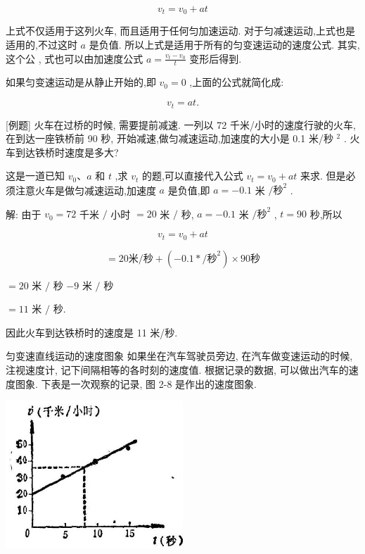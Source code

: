 \documentclass[10pt]{article}
\begin{document}
\[
{v}_{t} = {v}_{0} + {at}
\]

上式不仅适用于这列火车, 而且适用于任何匀加速运动. 对于匀减速运动,上式也是适用的,不过这时 \(a\) 是负值. 所以上式是适用于所有的匀变速运动的速度公式. 其实, 这个公 , 式也可以由加速度公式 \(a = \frac{{v}_{t} - {v}_{0}}{t}\) 变形后得到.

如果匀变速运动是从静止开始的,即 \({v}_{0} = 0\) ,上面的公式就简化成:

\[
{v}_{t} = {at}\text{.}
\]

[例题] 火车在过桥的时候, 需要提前减速. 一列以 72 千米/小时的速度行驶的火车, 在到达一座铁桥前 90 秒, 开始减速,做匀减速运动,加速度的大小是 0.1 米/秒 \({}^{2}\) . 火车到达铁桥时速度是多大?

这是一道已知 \({v}_{0}\text{、}a\) 和 \(t\) ,求 \({v}_{t}\) 的题,可以直接代入公式 \({v}_{t} = {v}_{0} + {at}\) 来求. 但是必须注意火车是做匀减速运动,加速度 \(a\) 是负值,即 \(a = - {0.1}\) 米 \(/{\text{秒}}^{2}\) .

解: 由于 \({v}_{0} = {72}\) 千米 \(/\) 小时 \(= {20}\) 米 \(/\) 秒, \(a = - {0.1}\) 米 \(/{秒}^{2}\) , \(t = {90}\) 秒,所以

\[
{v}_{t} = {v}_{0} + {at}
\]

\[
= {20}\text{米}/\text{秒} + \left( {-{0.1} * /{\text{秒}}^{2}}\right) \times {90}\text{秒}
\]

\(= {20}\) 米 \(/\) 秒 \(- 9\) 米 \(/\) 秒

\(= {11}\) 米 \(/\) 秒.

因此火车到达铁桥时的速度是 11 米/秒.

匀变速直线运动的速度图象 如果坐在汽车驾驶员旁边, 在汽车做变速运动的时候, 注视速度计, 记下间隔相等的各时刻的速度值. 根据记录的数据, 可以做出汽车的速度图象. 下表是一次观察的记录, 图 2-8 是作出的速度图象.

\begin{center}
\end{center}

\begin{center}
\includegraphics[max width=0.5\textwidth]{images/01912d55-147c-70aa-b0e0-1782a122f948_72_223897.jpg}
\end{center}
\end{document}
